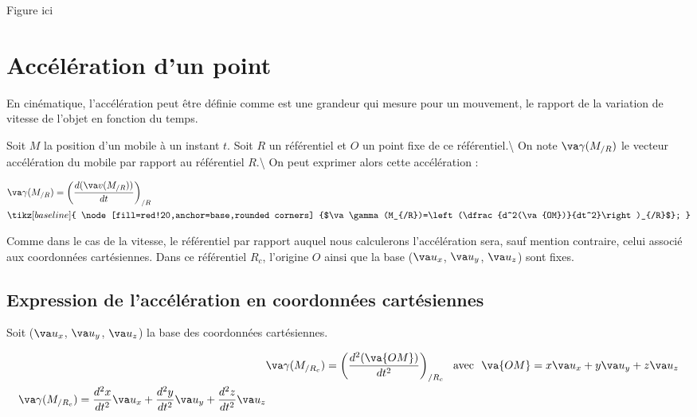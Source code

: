\documentclass[
  12pt,
  openany]{book}
\theoremstyle{plain}
\theoremstyle{remark}
\begin{document}
Figure ici

\chapter{Accélération d'un point}\label{accuxe9luxe9ration-dun-point}

En cinématique, l'accélération peut être définie comme est une grandeur
qui mesure pour un mouvement, le rapport de la variation de vitesse de
l'objet en fonction du temps.

Soit \(M\) la position d'un mobile à un instant \(t\). Soit \(R\) un
référentiel et \(O\) un point fixe de ce référentiel.\textbackslash{} On
note \(\va \gamma(M_{/R})\) le vecteur accélération du mobile par
rapport au référentiel \(R\).\textbackslash{} On peut exprimer alors
cette accélération :

\begin{align*}
    &\va \gamma(M_{/R})=\left(\frac{d(\va v(M_{/R}))}{dt}\right)_{/R}\\
    &\tikz[baseline]{
        \node[fill=red!20,anchor=base,rounded corners]
        {$\va \gamma(M_{/R})=\left(\dfrac{d^2(\va{OM})}{dt^2}\right)_{/R}$};
    } 
\end{align*}

Comme dans le cas de la vitesse, le référentiel par rapport auquel nous
calculerons l'accélération sera, sauf mention contraire, celui associé
aux coordonnées cartésiennes. Dans ce référentiel \(R_c\), l'origine
\(O\) ainsi que la base (\(\va u_x\), \(\va u_y\), \(\va u_z\)) sont
fixes.

\section{Expression de l'accélération en coordonnées
cartésiennes}\label{expression-de-laccuxe9luxe9ration-en-coordonnuxe9es-cartuxe9siennes}

Soit (\(\va u_x\), \(\va u_y\), \(\va u_z\)) la base des coordonnées
cartésiennes.

\begin{tcolorbox}[enhanced jigsaw, arc=.35mm, bottomrule=.15mm, bottomtitle=1mm, breakable, colback=white, colbacktitle=quarto-callout-tip-color!10!white, colframe=quarto-callout-tip-color-frame, coltitle=black, left=2mm, leftrule=.75mm, opacityback=0, opacitybacktitle=0.6, rightrule=.15mm, title=\textcolor{quarto-callout-tip-color}{\faLightbulb}\hspace{0.5em}{Tip}, titlerule=0mm, toprule=.15mm, toptitle=1mm]

\begin{align*}

&\va \gamma(M_{/R_c})=\left(\frac{d^2(\va{OM})}{dt^2}\right)_{/R_c} \ \ \text{avec} \ \ \va{OM} = x \va u_x + y \va u_y + z \va u_z\\
\va \gamma(M_{/R_c})=\dfrac{d^2x}{dt^2}\va u_x + \dfrac{d^2y}{dt^2}\va u_y + \dfrac{d^2z}{dt^2}\va u_z

\end{align*}

\end{tcolorbox}
\end{document}
